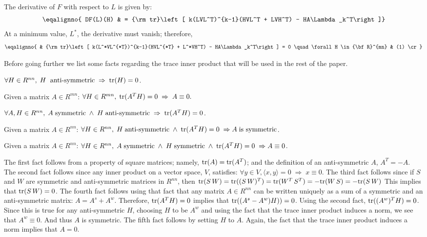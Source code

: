 The derivative of $F$ with respect to $L$ is given by:
$$
\eqalignno{
DF(L)(H) & = {\rm tr}\left[ k(LVL^T)^{k-1}(HVL^T + LVH^T) - 
HA\Lambda_k^T\right]}
$$
At a minimum value, $L^*$, the derivative must vanish; therefore,
$$
\eqalignno{
& {\rm tr}\left[ k(L^*VL^{*T})^{k-1}(HVL^{*T} + L^*VH^T) - 
HA\Lambda_k^T\right] = 0
  \quad \forall H \in {\bf R}^{mn} & (1) \cr}
$$

Before going further we list some facts regarding the trace inner product that 
will be used in the rest of the paper.

\item{$\forall H \in R^{nn},\; H \; \hbox{ anti-symmetric} \; \Rightarrow \; {\rm tr}(H) = 0$.}
\item{Given a matrix $A \in R^{mn}$: $\forall H \in R^{mn},\; {\rm tr}(A^T H) = 0 \; \Rightarrow \; A \equiv 0.$}
\item{$\forall A,H \in R^{nn}, \;A \; {\rm symmetric} \; \wedge \; H \; \hbox{anti-symmetric}\;  \Rightarrow \; {\rm tr}(A^T H) = 0$.}
\item{Given a matrix $A \in R^{nn}$: $\forall H \in R^{nn}, \; H \; \hbox{anti-symmetric} \; \wedge \; {\rm tr}(A^T H) = 0 \; \Rightarrow A \; \hbox{is symmetric}$.}
\item{Given a matrix $A \in R^{nn}$: $\forall H \in R^{nn}, \; A \; \hbox{symmetric} \; \wedge \; H \; \hbox{symmetric} \; \wedge \; {\rm tr}(A^T H) = 0 \; \Rightarrow A \equiv 0$.}

The first fact follows from a property of square matrices; namely,
${\rm tr}(A) = {\rm tr}(A^T)$; and the definition of an anti-symmetric $A$, $A^T = -A$.
The second fact follows since any inner product on a vector space, $V$, satisfies: 
$\forall y \in V, \langle x, y \rangle = 0 \; \Rightarrow \; x \equiv 0$. 
The third fact follows since if $S$ and $W$ are symmetric and anti-symmetric matrices in $R^{nn}$, then
${\rm tr}(S \, W) = {\rm tr}((S \, W)^T) = {\rm tr}(W^T \, S^T) = -{\rm tr}(W \, S) = - {\rm tr}(S\, W)$
This implies that ${\rm tr}(S \, W) = 0$.
The fourth fact follows using that fact that any matrix $A \in R^{nn}$ can be written uniquely as a sum of a symmetric
and an anti-symmetric matrix: $A = A^{s} + A^{w}$. Therefore, ${\rm tr}(A^T H) = 0$ implies that
${\rm tr}((A^{s} - A^{w}) H)) = 0$. Using the second fact, ${\rm tr}((A^w)^T H) = 0$. Since this is true for any
anti-symmetric $H$, choosing $H$ to be $A^{w}$ and using the fact that the trace inner product induces a norm, we 
see that $A^{w} \equiv 0$. And thus $A$ is symmetric.
The fifth fact follows by setting $H$ to $A$. Again, the fact that the trace inner product induces a norm implies 
that $A = 0$.


